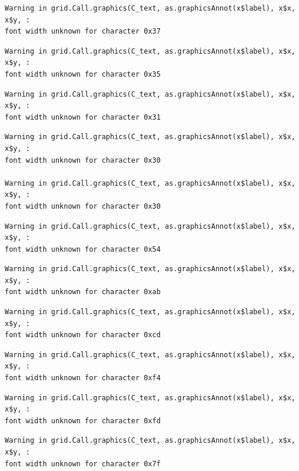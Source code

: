\documentclass[
  letterpaper,
  DIV=11,
  numbers=noendperiod]{scrreprt}
\begin{document}
\begin{verbatim}
Warning in grid.Call.graphics(C_text, as.graphicsAnnot(x$label), x$x, x$y, :
font width unknown for character 0x37
\end{verbatim}

\begin{verbatim}
Warning in grid.Call.graphics(C_text, as.graphicsAnnot(x$label), x$x, x$y, :
font width unknown for character 0x35
\end{verbatim}

\begin{verbatim}
Warning in grid.Call.graphics(C_text, as.graphicsAnnot(x$label), x$x, x$y, :
font width unknown for character 0x31
\end{verbatim}

\begin{verbatim}
Warning in grid.Call.graphics(C_text, as.graphicsAnnot(x$label), x$x, x$y, :
font width unknown for character 0x30

Warning in grid.Call.graphics(C_text, as.graphicsAnnot(x$label), x$x, x$y, :
font width unknown for character 0x30
\end{verbatim}

\begin{verbatim}
Warning in grid.Call.graphics(C_text, as.graphicsAnnot(x$label), x$x, x$y, :
font width unknown for character 0x54
\end{verbatim}

\begin{verbatim}
Warning in grid.Call.graphics(C_text, as.graphicsAnnot(x$label), x$x, x$y, :
font width unknown for character 0xab
\end{verbatim}

\begin{verbatim}
Warning in grid.Call.graphics(C_text, as.graphicsAnnot(x$label), x$x, x$y, :
font width unknown for character 0xcd
\end{verbatim}

\begin{verbatim}
Warning in grid.Call.graphics(C_text, as.graphicsAnnot(x$label), x$x, x$y, :
font width unknown for character 0xf4
\end{verbatim}

\begin{verbatim}
Warning in grid.Call.graphics(C_text, as.graphicsAnnot(x$label), x$x, x$y, :
font width unknown for character 0xfd
\end{verbatim}

\begin{verbatim}
Warning in grid.Call.graphics(C_text, as.graphicsAnnot(x$label), x$x, x$y, :
font width unknown for character 0x7f
\end{verbatim}
\end{document}
